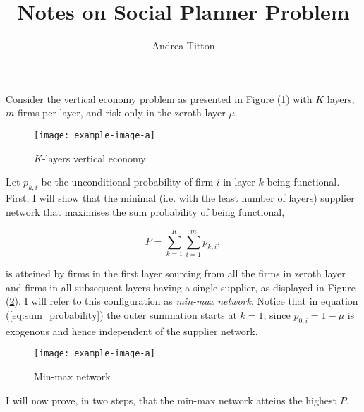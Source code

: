 \documentclass[american, abstract=on]{scrartcl}
\author{Andrea Titton}
\title{Notes on Social Planner Problem}
\newcommand{\inputTikZ}[2]{%
    \scalebox{#1}{}  
    }
\theoremstyle{plain}
\begin{document}
\maketitle

Consider the vertical economy problem as presented in Figure (\ref{fig:vertical-economy-diagram}) with $K$ layers, $m$ firms per layer, and risk only in the zeroth layer $\mu$.

\begin{figure}[H]
    \centering
    \texttt{[image: example-image-a]}
    \caption{$K$-layers vertical economy}
    \label{fig:vertical-economy-diagram}
\end{figure}

Let $p_{k, i}$ be the unconditional probability of firm $i$ in layer $k$ being functional. First, I will show that the minimal (i.e. with the least number of layers) supplier network that maximises the sum probability of being functional,

\begin{equation} \label{eq:sum_probability}
    P = \sum^{K}_{k = 1} \sum^m_{i = 1} p_{k, i},
\end{equation}

is atteined by firms in the first layer sourcing from all the firms in zeroth layer and firms in all subsequent layers having a single supplier, as displayed in Figure (\ref{fig:maximal-probability-diagram}). I will refer to this configuration as \textit{min-max network}. Notice that in equation (\ref{eq:sum_probability}) the outer summation starts at $k = 1$, since $p_{0, i} = 1 - \mu$ is exogenous and hence independent of the supplier network.

\begin{figure}[H]
    \centering
    \texttt{[image: example-image-a]}
    \caption{Min-max network} \label{fig:maximal-probability-diagram}
\end{figure}

I will now prove, in two steps, that the min-max network atteins the highest $P$.
\end{document}
